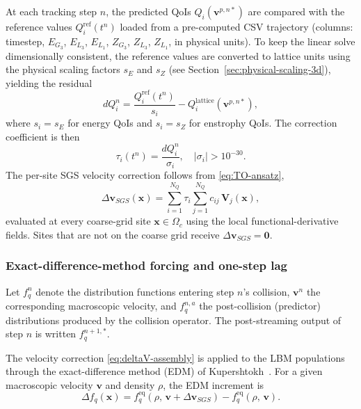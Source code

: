 \documentclass[]{elsarticle}
\begin{document}
At each tracking step $n$, the predicted QoIs $Q_i(\boldsymbol{v}^{p,n*})$ are compared with the reference values $Q_i^{\mathrm{ref}}(t^n)$ loaded from a pre-computed CSV trajectory (columns: timestep, $E_{G_3}$, $E_{L_3}$, $E_{L_1}$, $Z_{G_3}$, $Z_{L_3}$, $Z_{L_1}$, in physical units). To keep the linear solve dimensionally consistent, the reference values are converted to lattice units using the physical scaling factors $s_E$ and $s_Z$ (see Section~\ref{sec:physical-scaling-3d}), yielding the residual
\begin{equation}
    dQ_i^n = \frac{Q_i^{\mathrm{ref}}(t^n)}{s_i} - Q_i^{\mathrm{lattice}}(\boldsymbol{v}^{p,n*}),
\end{equation}
where $s_i = s_E$ for energy QoIs and $s_i = s_Z$ for enstrophy QoIs. The correction coefficient is then
\begin{equation}
    \tau_i(t^n) = \frac{dQ_i^n}{\sigma_i}, \quad |\sigma_i| > 10^{-30}.
\end{equation}
The per-site SGS velocity correction follows from \eqref{eq:TO-ansatz},
\begin{equation} \label{eq:deltaV-assembly}
    \Delta\boldsymbol{v}_{SGS}(\boldsymbol{x}) = \sum_{i=1}^{N_Q} \tau_i \sum_{j=1}^{N_Q} c_{ij}\, \mathbf{V}_j(\boldsymbol{x}),
\end{equation}
evaluated at every coarse-grid site $\boldsymbol{x} \in \Omega_c$ using the local functional-derivative fields. Sites that are not on the coarse grid receive $\Delta\boldsymbol{v}_{SGS}=\boldsymbol{0}$.

\subsubsection{Exact-difference-method forcing and one-step lag}
\label{sec:edm-forcing-3d}

Let $f_q^n$ denote the distribution functions entering step $n$'s collision, $\boldsymbol{v}^n$ the corresponding macroscopic velocity, and $f_q^{n,a}$ the post-collision (predictor) distributions produced by the collision operator. The post-streaming output of step $n$ is written $f_q^{n+1,*}$.

The velocity correction \eqref{eq:deltaV-assembly} is applied to the LBM populations through the exact-difference method (EDM) of Kupershtokh~\cite{kupershtokh_equations_2009}. For a given macroscopic velocity $\boldsymbol{v}$ and density $\rho$, the EDM increment is
\begin{equation} \label{eq:edm-apply}
    \Delta f_q(\boldsymbol{x}) = f_q^{\mathrm{eq}}\!\left(\rho,\, \boldsymbol{v} + \Delta\boldsymbol{v}_{SGS}\right) - f_q^{\mathrm{eq}}\!\left(\rho,\, \boldsymbol{v}\right).
\end{equation}
\end{document}
